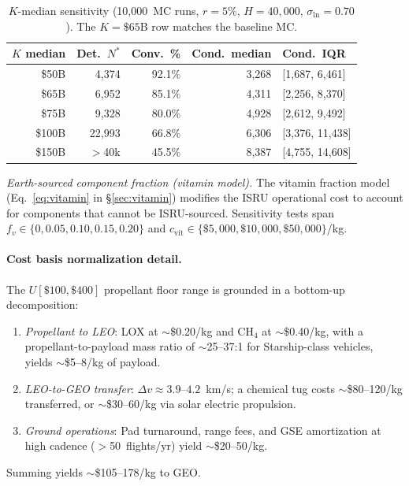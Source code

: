\documentclass[preprint,12pt]{elsarticle}
\begin{document}
\begin{table}[htbp]
\centering
\caption{$K$-median sensitivity (10{,}000~MC runs, $r = 5\%$, $H = 40{,}000$, $\sigma_{\ln} = 0.70$). The $K = \$65$B row matches the baseline MC.}
\label{tab:k_median_sweep}
\small
\begin{tabular}{@{}rrrrl@{}}
\toprule
$K$ median & Det.\ $N^*$ & Conv.\ \% & Cond.\ median & Cond.\ IQR \\
\midrule
\$50B  & 4{,}374  & 92.1\% & 3{,}268  & [1{,}687, 6{,}461] \\
\$65B  & 6{,}952  & 85.1\% & 4{,}311  & [2{,}256, 8{,}370] \\
\$75B  & 9{,}328  & 80.0\% & 4{,}928  & [2{,}612, 9{,}492] \\
\$100B & 22{,}993 & 66.8\% & 6{,}306  & [3{,}376, 11{,}438] \\
\$150B & $>$40k   & 45.5\% & 8{,}387  & [4{,}755, 14{,}608] \\
\bottomrule
\end{tabular}
\end{table}

\emph{Earth-sourced component fraction (vitamin model).} The vitamin fraction model (Eq.~\ref{eq:vitamin} in \S\ref{sec:vitamin}) modifies the ISRU operational cost to account for components that cannot be ISRU-sourced. Sensitivity tests span $f_v \in \{0, 0.05, 0.10, 0.15, 0.20\}$ and $c_{\mathrm{vit}} \in \{\$5{,}000, \$10{,}000, \$50{,}000\}$/kg.

\paragraph{Cost basis normalization detail.} The $U[\$100, \$400]$ propellant floor range is grounded in a bottom-up decomposition:
\begin{enumerate}
  \item \emph{Propellant to LEO}: LOX at $\sim$\$0.20/kg and CH$_4$ at $\sim$\$0.40/kg, with a propellant-to-payload mass ratio of $\sim$25--37:1 for Starship-class vehicles, yields $\sim$\$5--8/kg of payload.
  \item \emph{LEO-to-GEO transfer}: $\Delta v \approx 3.9$--$4.2$~km/s; a chemical tug costs $\sim$\$80--120/kg transferred, or $\sim$\$30--60/kg via solar electric propulsion.
  \item \emph{Ground operations}: Pad turnaround, range fees, and GSE amortization at high cadence ($>$50~flights/yr) yield $\sim$\$20--50/kg.
\end{enumerate}
Summing yields $\sim$\$105--178/kg to GEO.
\end{document}
